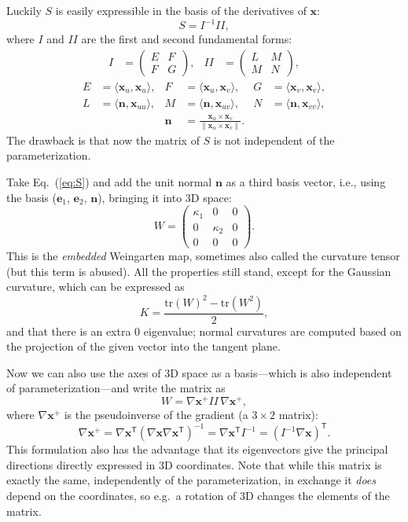 \documentclass[a4paper]{article}
\begin{document}
Luckily $S$ is easily expressible in the basis of the derivatives of
$\mathbf{x}$:
\[S=I^{-1}I\!I,\]
where $I$ and $I\!I$ are the first and second fundamental forms:
\begin{align*}
  I &= \begin{pmatrix}E&F\\F&G\end{pmatrix}, &
  I\!I &= \begin{pmatrix}L&M\\M&N\end{pmatrix},
\end{align*}
\begin{align*}
  E &= \langle\mathbf{x}_u,\mathbf{x}_u\rangle, &
  F &= \langle\mathbf{x}_u,\mathbf{x}_v\rangle, &
  G &= \langle\mathbf{x}_v,\mathbf{x}_v\rangle,\\
  L &= \langle\mathbf{n},\mathbf{x}_{uu}\rangle, &
  M &= \langle\mathbf{n},\mathbf{x}_{uv}\rangle, &
  N &= \langle\mathbf{n},\mathbf{x}_{vv}\rangle,\\
  && \mathbf{n} &= \frac{\mathbf{x}_u\times\mathbf{x}_v}{\|{\mathbf{x}_u\times\mathbf{x}_v}\|}. &&
\end{align*}
The drawback is that now the matrix of $S$ is not independent of the parameterization.

Take Eq.~(\ref{eq:S}) and add the unit normal $\mathbf{n}$ as a
third basis vector, i.e., using the basis ($\mathbf{e}_1$,
$\mathbf{e}_2$, $\mathbf{n}$), bringing it into 3D space:
\[
  W=
  \begin{pmatrix}
    \kappa_1 & 0 & 0\\
    0 & \kappa_2 & 0\\
    0 & 0 & 0
  \end{pmatrix}.
\]
This is the \emph{embedded} Weingarten map, sometimes also called the
curvature tensor (but this term is abused). All the properties still
stand, except for the Gaussian curvature, which can be expressed as
\[K = \frac{\mathrm{tr}(W)^2-\mathrm{tr}(W^2)}{2},\]
and that there is an extra $0$ eigenvalue; normal curvatures are
computed based on the projection of the given vector into the tangent plane.

Now we can also use the axes of 3D space as a basis---which is also
independent of parameterization---and write the matrix as
\[W=\nabla\mathbf{x}^+I\!I\,\nabla\mathbf{x}^+,\]
where $\nabla\mathbf{x}^+$ is the pseudoinverse of the gradient (a $3\times2$ matrix):
\[\nabla\mathbf{x}^+=
\nabla\mathbf{x}^\textsf{T}(\nabla\mathbf{x}\nabla\mathbf{x}^\textsf{T})^{-1}=
\nabla\mathbf{x}^\textsf{T}I^{-1}=
(I^{-1}\nabla\mathbf{x})^\textsf{T}.\]
This formulation also has the advantage that its eigenvectors give the
principal directions directly expressed in 3D coordinates. Note that
while this matrix is exactly the same, independently of the
parameterization, in exchange it \emph{does} depend on the
coordinates, so e.g.~a rotation of 3D changes the elements of the
matrix.
\end{document}
